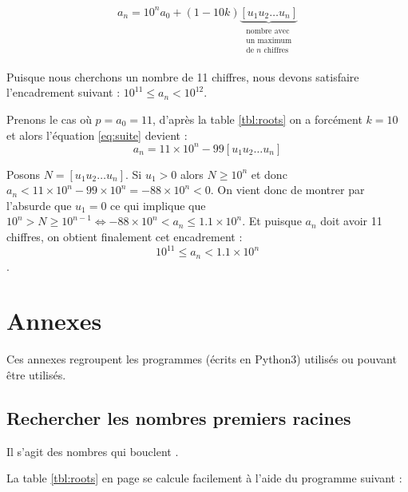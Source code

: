 \documentclass[10pt,a4paper]{article}
\begin{document}
\begin{equation}\label{eq:suite}
  a_n = 10^n a_0 + (1 - 10k) \underbrace{[u_1 u_2 \ldots u_n]}_{
    \begin{array}{c}
    \text{nombre avec}\\
    \text{un maximum}\\
    \text{de $n$ chiffres}\\
    \end{array}
  }
\end{equation}

Puisque nous cherchons un nombre de 11 chiffres, nous devons satisfaire l'encadrement suivant : $10^{11} \leq a_n < 10^{12}$.

Prenons le cas où $p=a_0=11$, d'après la table \ref{tbl:roots} on a forcément $k=10$
et alors l'équation \ref{eq:suite} devient :
$$a_n = 11 \times 10^n - 99[u_1 u_2 \ldots u_n]$$

Posons $N = [u_1u_2 \ldots u_n]$. Si $u_1 > 0$ alors $N \geq 10^n$ et donc 
$a_n < 11 \times 10^n -99 \times 10^n = -88 \times 10^n < 0$. On vient donc de montrer par l'absurde que $u_1 = 0$ ce qui implique que 
$10^n > N \geq 10^{n-1} \iff -88 \times 10^n < a_n \leq 1.1 \times 10^n$.
Et puisque $a_n$ doit avoir 11 chiffres, on obtient finalement cet encadrement :
$$10^11 \leq a_n < 1.1 \times 10^n$$.
\appendix

\section{Annexes}
Ces annexes regroupent les programmes (écrits en Python3) utilisés ou pouvant être utilisés.

\subsection{Rechercher les nombres premiers racines} 
Il s'agit des nombres qui \og bouclent \fg.

La table \ref{tbl:roots} en page \pageref{tbl:roots} se calcule facilement à l'aide du programme suivant :


\end{document}
